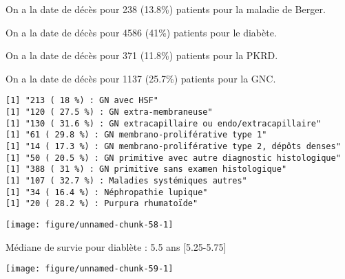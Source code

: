 \documentclass[11pt,a4paper]{article}\usepackage[]{graphicx}\usepackage[]{color}
\makeatletter
\def\maxwidth{ %
  \ifdim\Gin@nat@width>\linewidth
    \linewidth
  \else
    \Gin@nat@width
  \fi
}
\newenvironment{kframe}{%
 \def\at@end@of@kframe{}%
 \ifinner\ifhmode%
  \def\at@end@of@kframe{\end{minipage}}%
  \begin{minipage}{\columnwidth}%
 \fi\fi%
 \def\FrameCommand##1{\hskip\@totalleftmargin \hskip-\fboxsep
 \colorbox{shadecolor}{##1}\hskip-\fboxsep
     \hskip-\linewidth \hskip-\@totalleftmargin \hskip\columnwidth}%
 \MakeFramed {\advance\hsize-\width
   \@totalleftmargin\z@ \linewidth\hsize
   \@setminipage}}%
 {\par\unskip\endMakeFramed%
 \at@end@of@kframe}
\newenvironment{knitrout}{}{} %
\makeatother
\begin{document}
  On a la date de décès pour 238 (13.8\%) patients pour la maladie de Berger.
  
  On a la date de décès pour 4586 (41\%) patients pour le diabète.
  
  On a la date de décès pour 371 (11.8\%) patients pour la PKRD.
  
  On a la date de décès pour 1137 (25.7\%) patients pour la GNC.

\begin{knitrout}
\color{fgcolor}\begin{kframe}
\begin{verbatim}
[1] "213 ( 18 %) : GN avec HSF"
[1] "120 ( 27.5 %) : GN extra-membraneuse"
[1] "130 ( 31.6 %) : GN extracapillaire ou endo/extracapillaire"
[1] "61 ( 29.8 %) : GN membrano-proliférative type 1"
[1] "14 ( 17.3 %) : GN membrano-proliférative type 2, dépôts denses"
[1] "50 ( 20.5 %) : GN primitive avec autre diagnostic histologique"
[1] "388 ( 31 %) : GN primitive sans examen histologique"
[1] "107 ( 32.7 %) : Maladies systémiques autres"
[1] "34 ( 16.4 %) : Néphropathie lupique"
[1] "20 ( 28.2 %) : Purpura rhumatoïde"
\end{verbatim}
\end{kframe}
\end{knitrout}


\begin{knitrout}
\color{fgcolor}
\texttt{[image: figure/unnamed-chunk-58-1]} 

\end{knitrout}

Médiane de survie pour diablète : 5.5 ans [5.25-5.75]

\begin{knitrout}
\color{fgcolor}
\texttt{[image: figure/unnamed-chunk-59-1]} 

\end{knitrout}
\end{document}
